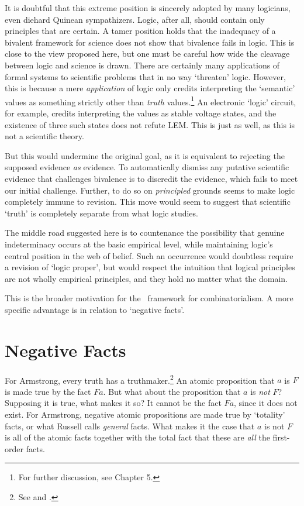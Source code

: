 It is doubtful that this extreme position is sincerely adopted by many logicians, even diehard Quinean sympathizers. Logic, after all, should contain only principles that are certain. A tamer position holds that the inadequacy of a bivalent framework for science does not show that bivalence fails in logic. This is close to the view proposed here, but one must be careful how wide the cleavage between logic and science is drawn. There are certainly many applications of formal systems to scientific problems that in no way `threaten' logic. However, this is because a mere \emph{application} of logic only credits interpreting the `semantic' values as something strictly other than \emph{truth} values.\footnote{For further discussion, see Chapter 5.} An electronic `logic' circuit, for example, credits interpreting the values as stable voltage states, and the existence of three such states does not refute LEM. This is just as well, as this is not a scientific theory. 

But this would undermine the original goal, as it is equivalent to rejecting the supposed evidence \emph{as} evidence. To automatically dismiss any putative scientific evidence that challenges bivalence is to discredit the evidence, which fails to meet our initial challenge. Further, to do so on \emph{principled} grounds seems to make logic completely immune to revision. This move would seem to suggest that scientific `truth' is completely separate from what logic studies. 

The middle road suggested here is to countenance the possibility that genuine indeterminacy occurs at the basic empirical level, while maintaining logic's central position in the web of belief. Such an occurrence would doubtless require a revision of `logic proper', but would respect the intuition that logical principles are not wholly empirical principles, and they hold no matter what the domain. 

This is the broader motivation for the \GOModal\ framework for combinatorialism. A more specific advantage is in relation to `negative facts'.
\section{Negative Facts}\label{negativeFacts}

For Armstrong, every truth has a truthmaker.\footnote{See \citeyear[p. 150]{Armstrong:2000} and \citeyear[pp. 5, 19]{Armstrong2004}.} An atomic proposition that $a$ is $F$ is made true by the fact $Fa$. But what about the proposition that $a$ is \emph{not} $F$? Supposing it is true, what makes it so? It cannot be the fact $Fa$, since it does not exist. For Armstrong, negative atomic propositions are made true by `totality' facts, or what Russell \citeyear{Russell:18} calls \emph{general} facts. What makes it the case that $a$ is not $F$ is all of the atomic facts together with the total fact that these are \emph{all} the first-order facts.

